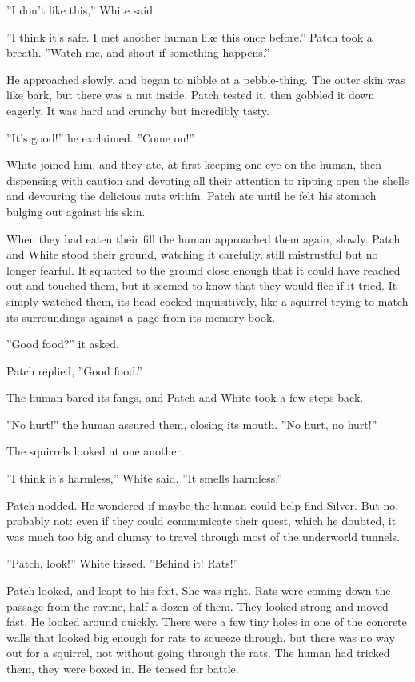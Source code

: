 \documentclass[12pt]{book}
\begin{document}
''I don't like this,'' White said.

''I think it's safe. I met another human like this once before.'' Patch took a breath. ''Watch me, and shout if something happens.''

He approached slowly, and began to nibble at a pebble-thing. The outer skin was like bark, but there was a nut inside. Patch tested it, then gobbled it down eagerly. It was hard and crunchy but incredibly tasty.

''It's good!'' he exclaimed. ''Come on!''

White joined him, and they ate, at first keeping one eye on the human, then dispensing with caution and devoting all their attention to ripping open the shells and devouring the delicious nuts within. Patch ate until he felt his stomach bulging out against his skin.

When they had eaten their fill the human approached them again, slowly. Patch and White stood their ground, watching it carefully, still mistrustful but no longer fearful. It squatted to the ground close enough that it could have reached out and touched them, but it seemed to know that they would flee if it tried. It simply watched them, its head cocked inquisitively, like a squirrel trying to match its surroundings against a page from its memory book.

''Good food?'' it asked.

Patch replied, ''Good food.''

The human bared its fangs, and Patch and White took a few steps back.

''No hurt!'' the human assured them, closing its mouth. ''No hurt, no hurt!''

The squirrels looked at one another.

''I think it's harmless,'' White said. ''It smells harmless.''

Patch nodded. He wondered if maybe the human could help find Silver. But no, probably not: even if they could communicate their quest, which he doubted, it was much too big and clumsy to travel through most of the underworld tunnels.

''Patch, look!'' White hissed. ''Behind it! Rats!''

Patch looked, and leapt to his feet. She was right. Rats were coming down the passage from the ravine, half a dozen of them. They looked strong and moved fast. He looked around quickly. There were a few tiny holes in one of the concrete walls that looked big enough for rats to squeeze through, but there was no way out for a squirrel, not without going through the rats. The human had tricked them, they were boxed in. He tensed for battle.
\end{document}
